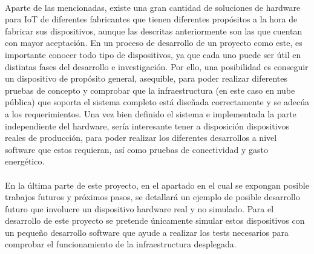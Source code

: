 \documentclass[../../memoria.tex]{subfiles}
\begin{document}
\paragraph{}
Aparte de las mencionadas, existe una gran cantidad de soluciones de hardware para IoT de diferentes fabricantes que tienen diferentes propósitos a la hora de fabricar sus dispositivos, aunque las  descritas anteriormente son las que cuentan con mayor aceptación. En un proceso de desarrollo de un proyecto como este, es importante conocer todo tipo de dispositivos, ya que cada uno puede ser útil en distintas fases del desarrollo e investigación. Por ello, una posibilidad es conseguir un dispositivo de propósito general, asequible, para poder realizar diferentes pruebas de concepto y comprobar que la infraestructura (en este caso en nube pública) que soporta el sistema completo está diseñada correctamente y se adecúa a los requerimientos. Una vez bien definido el sistema e implementada la parte independiente del hardware, sería interesante tener a disposición dispositivos reales de producción, para poder realizar los diferentes desarrollos a nivel software que estos requieran, así como pruebas de conectividad y gasto energético.

\paragraph{}
En la última parte de este proyecto, en el apartado en el cual se expongan posible trabajos futuros y próximos pasos, se detallará un ejemplo de posible desarrollo futuro que involucre un dispositivo hardware real y no simulado. Para el desarrollo de este proyecto se pretende únicamente simular estos dispositivos con un pequeño desarrollo software que ayude a realizar los tests necesarios para comprobar el funcionamiento de la infraestructura desplegada.
\end{document}
